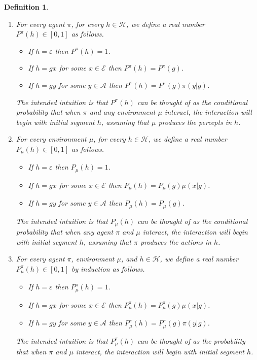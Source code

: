 \documentclass[twoside]{article}
\newtheorem{definition}[theorem]{Definition}
\begin{document}
\begin{definition}
\label{pullbackdef}
    \begin{enumerate}
        \item
        For every agent $\pi$, for every $h\in\mathcal H$, we define a real number
        $P^\pi(h)\in[0,1]$ as follows.
        \begin{itemize}
            \item
            If $h=\varepsilon$ then $P^\pi(h)=1$.
            \item
            If $h=gx$ for some $x\in\mathcal E$ then $P^\pi(h)=P^\pi(g)$.
            \item
            If $h=gy$ for some $y\in\mathcal A$ then $P^\pi(h)=P^\pi(g)\pi(y|g)$.
        \end{itemize}
        The intended intuition is that $P^\pi(h)$ can be thought of as the
        conditional probability that when $\pi$
        and any environment
        $\mu$ interact, the interaction will begin with initial segment
        $h$, \emph{assuming}
        that $\mu$ produces the percepts in $h$.
        \item
        For every environment $\mu$, for every $h\in\mathcal H$, we define a real number
        $P_\mu(h)\in[0,1]$ as follows.
        \begin{itemize}
            \item
            If $h=\varepsilon$ then $P_\mu(h)=1$.
            \item
            If $h=gx$ for some $x\in\mathcal E$ then $P_\mu(h)=P_\mu(g)\mu(x|g)$.
            \item
            If $h=gy$ for some $y\in\mathcal A$ then $P_\mu(h)=P_\mu(g)$.
        \end{itemize}
        The intended intuition is that $P_\mu(h)$ can be thought of as the
        conditional probability that when any agent $\pi$ and $\mu$ interact,
        the interaction will begin with initial segment $h$, \emph{assuming} that
        $\pi$ produces the actions in $h$.
        \item
        For every agent $\pi$, environment $\mu$, and $h\in\mathcal H$, we define a
        real number $P^\pi_\mu(h)\in[0,1]$ by induction as follows.
        \begin{itemize}
            \item
            If $h=\varepsilon$ then $P^\pi_\mu(h)=1$.
            \item
            If $h=gx$ for some $x\in\mathcal E$ then
            $P^\pi_\mu(h)=P^\pi_\mu(g)\mu(x|g)$.
            \item
            If $h=gy$ for some $y\in\mathcal A$ then
            $P^\pi_\mu(h)=P^\pi_\mu(g)\pi(y|g)$.
        \end{itemize}
        The intended intuition is that $P^\pi_\mu(h)$ can be thought of as
        the probability that when $\pi$ and $\mu$ interact, the interaction
        will begin with initial segment $h$.
    \end{enumerate}
\end{definition}
\end{document}
